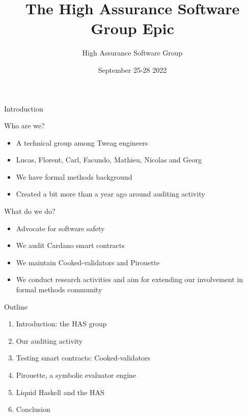\documentclass[11pt]{beamer}
\author{High Assurance Software Group}
\title{The High Assurance Software Group Epic}
\institute{Tweag.io}
\date{September 25-28 2022}
\begin{document}
\begin{frame}
\titlepage
\end{frame}

\begin{frame}{Introduction}
\begin{block}{Who are we?}
\begin{itemize}
\item A technical group among Tweag engineers
\item Lucas, Florent, Carl, Facundo, Mathieu, Nicolas and Georg
\item We have formal methods background
\item Created a bit more than a year ago around auditing activity
\end{itemize}
\end{block}
\begin{block}{What do we do?}
\begin{itemize}
\item Advocate for software safety
\item We audit Cardano smart contracts
\item We maintain Cooked-validators and Pirouette
\item We conduct research activities and aim for extending our involvement in formal methods community
\end{itemize}
\end{block}
\end{frame}

\begin{frame}{Outline}
\begin{enumerate}
\item Introduction: the HAS group
\item Our auditing activity
\item Testing smart contracts: Cooked-validators
\item Pirouette, a symbolic evaluator engine
\item Liquid Haskell and the HAS
\item Conclusion
\end{enumerate}
\end{frame}
\end{document}
